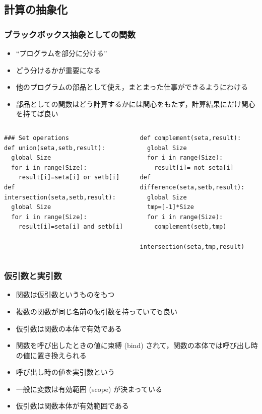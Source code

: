 \subsection{計算の抽象化}
\begin{frame}
\frametitle{ブラックボックス抽象としての関数}
  \begin{itemize}
\item ``プログラムを部分に分ける''
\item どう分けるかが重要になる
\item 他のプログラムの部品として使え，まとまった仕事ができるようにわける
\item 部品としての関数はどう計算するかには関心をもたず，計算結果にだけ関心を持てば良い
  \end{itemize}
  \begin{columns}[t]
    \begin{column}{0.45\textwidth}
      \begin{lstlisting}[caption={bit\_string.py},label=lst:fun_abst]
### Set operations
def union(seta,setb,result):
  global Size
  for i in range(Size):
    result[i]=seta[i] or setb[i]
def intersection(seta,setb,result):
  global Size
  for i in range(Size):
    result[i]=seta[i] and setb[i]
      \end{lstlisting}
    \end{column}
    \begin{column}{0.45\textwidth}
      \begin{lstlisting}[caption={bit\_string.py},label=lst:fun_abst2,firstnumber=last]
def complement(seta,result):
  global Size
  for i in range(Size):
    result[i]= not seta[i]
def difference(seta,setb,result):
  global Size
  tmp=[-1]*Size
  for i in range(Size):
    complement(setb,tmp)
    intersection(seta,tmp,result)
      \end{lstlisting}
    \end{column}
  \end{columns}
\end{frame}
\begin{frame}[fragile]
\frametitle{仮引数と実引数}
  \begin{itemize}
\item 関数は仮引数というものをもつ
\item 複数の関数が同じ名前の仮引数を持っていても良い
\item 仮引数は関数の本体で有効である
\item 関数を呼び出したときの値に束縛 (bind) されて，関数の本体では呼び出し時の値に置き換えられる
\item 呼び出し時の値を実引数という
\item 一般に変数は有効範囲 (scope) が決まっている
\item 仮引数は関数本体が有効範囲である
  \end{itemize}
\end{frame}
%
%

